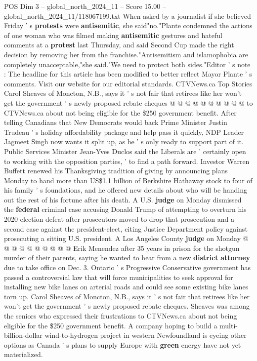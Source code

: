 \begin{textsample}{POS Dim 3 – global\_north\_2024\_11 – Score 15.00 – global\_north\_2024\_11/118067199.txt}
When asked by a journalist if she believed Friday ' s \textbf{protests} were \textbf{antisemitic}, she said"no."Plante condemned the actions of one woman who was filmed making \textbf{antisemitic} gestures and hateful comments at a \textbf{protest} last Thursday, and said Second Cup made the right decision by removing her from the franchise."Antisemitism and islamophobia are completely unacceptable,"she said."We need to protect both sides."Editor ' s note : The headline for this article has been modified to better reflect Mayor Plante ' s comments.
Visit our website for our editorial standards.
CTVNews.ca Top Stories Carol Sheaves of Moncton, N.B., says it ' s not fair that retirees like her won't get the government ' s newly proposed rebate cheques @ @ @ @ @ @ @ @ @ @ to CTVNews.ca about not being eligible for the \$250 government benefit.
After telling Canadians that New Democrats would back Prime Minister Justin Trudeau ' s holiday affordability package and help pass it quickly, NDP Leader Jagmeet Singh now wants it split up, as he ' s only ready to support part of it.
Public Services Minister Jean-Yves Duclos said the Liberals are ' certainly open to working with the opposition parties, ' to find a path forward.
Investor Warren Buffett renewed his Thanksgiving tradition of giving by announcing plans Monday to hand more than US\$1.1 billion of Berkshire Hathaway stock to four of his family ' s foundations, and he offered new details about who will be handing out the rest of his fortune after his death.
A U.S. \textbf{judge} on Monday dismissed the \textbf{federal} criminal case accusing Donald Trump of attempting to overturn his 2020 election defeat after prosecutors moved to drop that prosecution and a second case against the president-elect, citing Justice Department policy against prosecuting a sitting U.S. president.
A Los Angeles County \textbf{judge} on Monday @ @ @ @ @ @ @ @ @ @ Erik Menendez after 35 years in prison for the shotgun murder of their parents, saying he wanted to hear from a new \textbf{district} \textbf{attorney} due to take office on Dec. 3.
Ontario ' s Progressive Conservative government has passed a controversial law that will force municipalities to seek approval for installing new bike lanes on arterial roads and could see some existing bike lanes torn up.
Carol Sheaves of Moncton, N.B., says it ' s not fair that retirees like her won't get the government ' s newly proposed rebate cheques.
Sheaves was among the seniors who expressed their frustrations to CTVNews.ca about not being eligible for the \$250 government benefit.
A company hoping to build a multi-billion-dollar wind-to-hydrogen project in western Newfoundland is eyeing other options as Canada ' s plans to supply Europe with \textbf{green} energy have not yet materialized.

\end{textsample}
